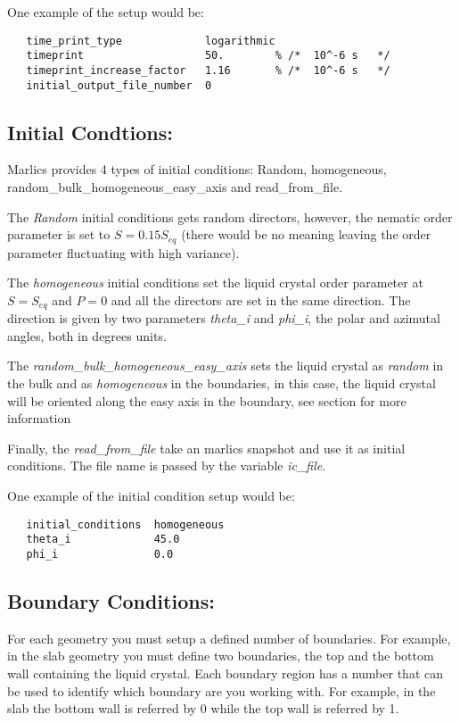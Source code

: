 \documentclass{article}
\begin{document}
One example of the setup would be:
\begin{lstlisting}
   time_print_type             logarithmic
   timeprint                   50.        % /*  10^-6 s   */
   timeprint_increase_factor   1.16       % /*  10^-6 s   */     
   initial_output_file_number  0	
\end{lstlisting}



\subsection{Initial Condtions:}

Marlics provides 4 types of initial conditions: Random, homogeneous, random_bulk_homogeneous_easy_axis and read_from_file.

The \textit{Random} initial conditions gets random directors, however, the nematic order parameter is set to $S=0.15 S_{eq}$ (there would be no meaning leaving the order parameter fluctuating with high variance).

The \textit{homogeneous} initial conditions set the liquid crystal order parameter at $S=S_{eq}$ and $P=0$ and all the directors are set in the same direction. The direction is given by two parameters \textit{theta_i} and \textit{phi_i}, the polar and azimutal angles, both in degrees units.

The \textit{random_bulk_homogeneous_easy_axis} sets the liquid crystal as \textit{random} in the bulk and as \textit{homogeneous} in the boundaries, in this case, the liquid crystal will be oriented along the easy axis in the boundary, see section \label{ssec:boundary} for more information

Finally, the \textit{read_from_file} take an marlics snapshot and use it as initial conditions. The file name is passed by the variable \textit{ic_file}. 

One example of the initial condition setup would be:
\begin{lstlisting}
   initial_conditions  homogeneous
   theta_i             45.0
   phi_i               0.0	
\end{lstlisting}


\subsection{Boundary Conditions:}\label{ssex:boundary}

For each geometry you must setup a defined number of boundaries. For example, in the slab geometry you must define two boundaries, the top and the bottom wall containing the liquid crystal. Each boundary region has a number that can be used to identify which boundary are you working with. For example, in the slab the bottom wall is referred by 0 while the top wall is referred by 1.
\end{document}
